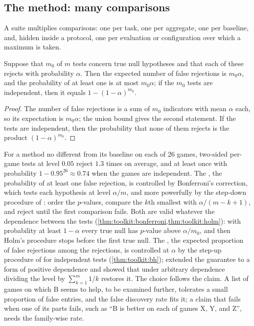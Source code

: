 \begin{refsection}
\section{The method: many comparisons}\label{sec:aggregates:comparisons}

A suite multiplies comparisons: one per task, one per aggregate, one per baseline, and, hidden inside a protocol, one per evaluation or configuration over which a maximum is taken.

\begin{proposition}\label{prop:aggregates:many}
Suppose that $m_0$ of $m$ tests concern true null hypotheses and that each of these rejects with probability $\alpha$. Then the expected number of false rejections is $m_0\alpha$, and the probability of at least one is at most $m_0\alpha$; if the $m_0$ tests are independent, then it equals $1-(1-\alpha)^{m_0}$.
\end{proposition}

\begin{proof}
The number of false rejections is a sum of $m_0$ indicators with mean $\alpha$ each, so its expectation is $m_0\alpha$; the union bound gives the second statement. If the tests are independent, then the probability that none of them rejects is the product $(1-\alpha)^{m_0}$.
\end{proof}

For a method no different from its baseline on each of 26 games, two-sided per-game tests at level $0.05$ reject $1.3$ times on average, and at least once with probability $1-0.95^{26}\approx0.74$ when the games are independent. The , the probability of at least one false rejection, is controlled by Bonferroni's correction, which tests each hypothesis at level $\alpha/m$, and more powerfully by the step-down procedure of \textcite{Holm1979}: order the $p$-values, compare the $k$th smallest with $\alpha/(m-k+1)$, and reject until the first comparison fails. Both are valid whatever the dependence between the tests (\cref{thm:toolkit:bonferroni,thm:toolkit:holm}): with probability at least $1-\alpha$ every true null has $p$-value above $\alpha/m_0$, and then Holm's procedure stops before the first true null. The , the expected proportion of false rejections among the rejections, is controlled at $\alpha$ by the step-up procedure of \textcite{BenjaminiHochberg1995} for independent tests (\cref{thm:toolkit:bh}); \textcite{BenjaminiYekutieli2001} extended the guarantee to a form of positive dependence and showed that under arbitrary dependence dividing the level by $\sum_{k=1}^m1/k$ restores it. The choice follows the claim. A list of games on which B seems to help, to be examined further, tolerates a small proportion of false entries, and the false discovery rate fits it; a claim that fails when one of its parts fails, such as ``B is better on each of games X, Y, and Z'', needs the family-wise rate.


\end{refsection}
